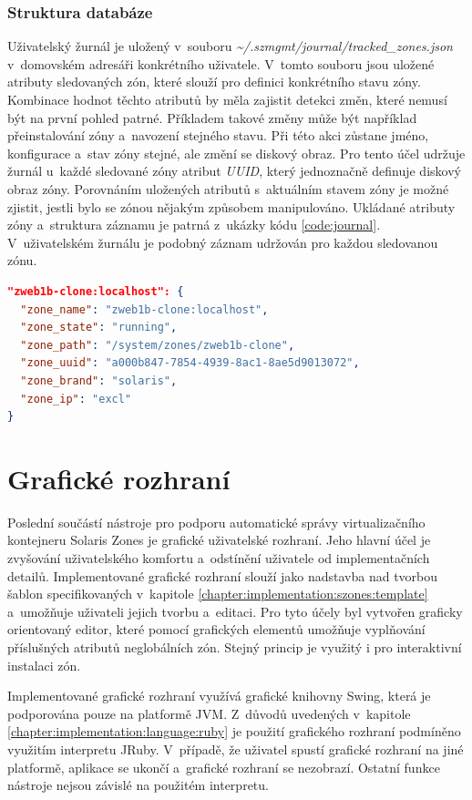 \subsubsection{Struktura databáze}
\label{chapter:implementation:client:journal:database}
Uživatelský žurnál je uložený v~souboru \textit{\textasciitilde/.szmgmt/journal/tracked\_zones.json} v~domovském adresáři
konkrétního uživatele. V~tomto souboru jsou uložené atributy sledovaných zón, které slouží pro definici konkrétního stavu zóny.
Kombinace hodnot těchto atributů by měla zajistit detekci změn, které nemusí být na první pohled patrné. Příkladem takové změny
může být například přeinstalování zóny a~navození stejného stavu. Při této akci zůstane jméno, konfigurace a~stav zóny stejné,
ale změní se diskový obraz. Pro tento účel udržuje žurnál u~každé sledované zóny atribut \textit{UUID}, který jednoznačně
definuje diskový obraz zóny. Porovnáním uložených atributů s~aktuálním stavem zóny je možné zjistit, jestli bylo se zónou 
nějakým způsobem manipulováno. Ukládané atributy zóny a~struktura záznamu je patrná z~ukázky kódu \ref{code:journal}.
V~uživatelském žurnálu je podobný záznam udržován pro každou sledovanou zónu.
\begin{lstlisting}[language=json, caption={Záznam stavu zóny v~žurnálu}, float,label={code:journal}]  
"zweb1b-clone:localhost": {
  "zone_name": "zweb1b-clone:localhost",
  "zone_state": "running",
  "zone_path": "/system/zones/zweb1b-clone",
  "zone_uuid": "a000b847-7854-4939-8ac1-8ae5d9013072",
  "zone_brand": "solaris",
  "zone_ip": "excl"
}
\end{lstlisting}
\section{Grafické rozhraní}
\label{chapter:implementation:gui}
Poslední součástí nástroje pro podporu automatické správy virtualizačního kontejneru Solaris Zones je grafické uživatelské 
rozhraní. Jeho hlavní účel je zvyšování uživatelského komfortu a~odstínění uživatele od implementačních detailů. 
Implementované grafické rozhraní slouží jako nadstavba nad tvorbou šablon specifikovaných v~kapitole \ref{chapter:implementation:szones:template}
a~umožňuje uživateli jejich tvorbu a~editaci. Pro tyto účely byl vytvořen graficky orientovaný editor, které pomocí grafických
elementů umožňuje vyplňování příslušných atributů neglobálních zón. Stejný princip je využitý i pro interaktivní instalaci 
zón.

Implementované grafické rozhraní využívá grafické knihovny Swing, která je podporována pouze na platformě JVM. Z~důvodů uvedených
v~kapitole \ref{chapter:implementation:language:ruby} je použití grafického rozhraní podmíněno využitím interpretu JRuby.
V~případě, že uživatel spustí grafické rozhraní na jiné platformě, aplikace se ukončí a~grafické rozhraní se nezobrazí. Ostatní
funkce nástroje nejsou závislé na použitém interpretu.
